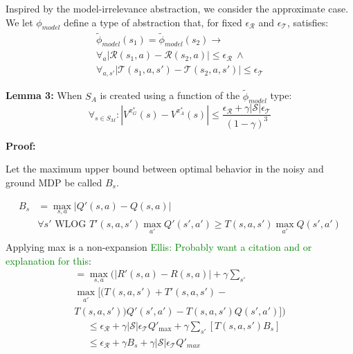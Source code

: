 \documentclass{article}
\newcommand{\ep}{\widetilde \phi}
\newcommand\enote[1]{\textcolor{green}{Ellis: #1}}
\begin{document}
Inspired by the model-irrelevance abstraction, we consider the approximate case. We let $\phi_{model}$ define a type of abstraction that, for fixed $\epsilon_\mathcal{R}$ and $\epsilon_\mathcal{T}$, satisfies:
\begin{multline}
\ep_{model}(s_1) = \ep_{model}(s_2) \rightarrow \\
\forall_a \left|\mathcal{R}(s_1, a) - \mathcal{R}(s_2, a)\right| \leq \epsilon_\mathcal{R}\ \wedge\ \\
\forall_{a,s'} \left|\mathcal{T}(s_1, a,s') - \mathcal{T}(s_2, a,s')\right| \leq \epsilon_\mathcal{T}
\end{multline}

{\bf Lemma 3:} When $S_A$ is created using a function of the $\ep_{model}$ type:
\begin{equation}
\forall_{s \in S_M} : | V^{\pi^*_G}(s) - V^{\pi^*_{A}}(s) | \leq \frac{{\epsilon_{\mathcal{R}}} + \gamma |\mathcal{S}|\epsilon_{\mathcal{T}}}{(1-\gamma)^3}
\end{equation}

{\bf Proof:}

Let the maximum upper bound between optimal behavior in the noisy and ground MDP be called $B_s$.

\begin{align*}
B_{s} &= \max_{s,a}|Q'(s,a)-Q(s,a)|\\
&\forall s' \text{ WLOG } T'(s,a,s')\max_{a'}Q'(s',a') \geq T(s,a,s')\max_{a'}Q(s',a')\\
\end{align*}
Applying max is a non-expansion \enote{Probably want a citation and or explanation for this}:
\begin{multline}
=\max_{s,a}(|R'(s,a)-R(s,a)| + \gamma \sum_{s'} \\
\max_{a'} [(T(s,a,s')+T'(s,a,s')- \\ T(s,a,s'))Q'(s', a')-T(s,a,s')Q(s',a')])
\end{multline}
\begin{align*}
&\leq \epsilon_{\mathcal{R}}+\gamma |\mathcal{S}|\epsilon_{\mathcal{T}}Q'_{\text{max}} + \gamma \sum_{s'}\left[ T(s,a,s') B_s\right]\\
&\leq \epsilon_{\mathcal{R}} + \gamma B_{s} + \gamma |\mathcal{S}|\epsilon_{\mathcal{T}}Q'_{max}
\end{align*}
\end{document}
